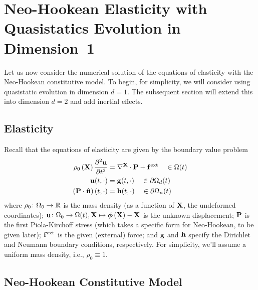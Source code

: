 \section{Neo-Hookean Elasticity with Quasistatics Evolution in Dimension~1}

Let us now consider the numerical solution of the equations of elasticity with the Neo-Hookean constitutive model. To begin, for simplicity, we will consider using quasistatic evolution in dimension $d = 1$. The subsequent section will extend this into dimension $d = 2$ and add inertial effects.

\subsection{Elasticity}

Recall that the equations of elasticity are given by the boundary value problem
\begin{subequations}\label{eq:elasticity.i}
\begin{align}
\rho_0 \left( \mathbf{X} \right) \frac{\partial^2 \mathbf{u}}{\partial t^2} & = \nabla^{\mathbf{X}} \cdot \mathbf{P} + \mathbf{f}^{\text{ext}} \quad \in \Omega(t) \\
\mathbf{u}(t,\cdot) & = \mathbf{g}(t,\cdot) \quad \in \partial \Omega_d(t) \\
\left( \mathbf{P} \cdot \mathbf{\hat{n}} \right) (t,\cdot) & = \mathbf{h}(t,\cdot) \quad \in \partial \Omega_n(t)
\end{align}
\end{subequations}
where $\rho_0 \colon \Omega_0 \to \mathbb{R}$ is the mass density (as a function of $\mathbf{X}$, the undeformed coordinates); $\mathbf{u} \colon \Omega_0 \to \Omega(t), \mathbf{X} \mapsto \boldsymbol{\phi} \left( \mathbf{X} \right) - \mathbf{X}$ is the unknown displacement; $\mathbf{P}$ is the first Piola-Kirchoff stress (which takes a specific form for Neo-Hookean, to be given later); $\mathbf{f}^{\text{ext}}$ is the given (external) force; and $\mathbf{g}$ and $\mathbf{h}$ specify the Dirichlet and Neumann boundary conditions, respectively. For simplicity, we'll assume a uniform mass density, i.e., $\rho_0 \equiv 1$.

\subsection{Neo-Hookean Constitutive Model}

